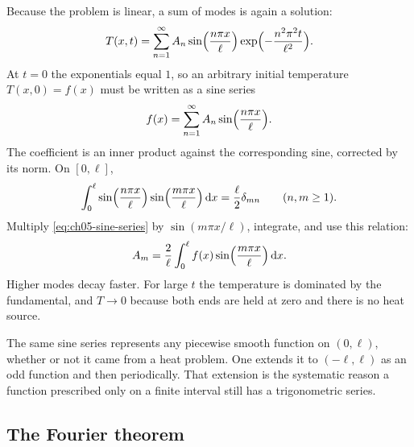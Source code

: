 Because the problem is linear, a sum of modes is again a solution:
\begin{equation}
T(x,t)=\sum_{n=1}^{\infty}A_n\sin\Bigl(\frac{n\pi x}{\ell}\Bigr)
\exp\Bigl(-\frac{n^2\pi^2 t}{\ell^2}\Bigr).
\end{equation}
At $t=0$ the exponentials equal $1$, so an arbitrary initial temperature $T(x,0)=f(x)$ must be written as a sine series
\begin{equation}
f(x)=\sum_{n=1}^{\infty}A_n\sin\Bigl(\frac{n\pi x}{\ell}\Bigr).
\label{eq:ch05-sine-series}
\end{equation}
The coefficient is an inner product against the corresponding sine, corrected by its norm. On $[0,\ell]$,
\begin{equation}
\int_0^\ell\sin\Bigl(\frac{n\pi x}{\ell}\Bigr)\sin\Bigl(\frac{m\pi x}{\ell}\Bigr)\,\mathrm{d}x
=\frac{\ell}{2}\delta_{mn}
\qquad(n,m\geq 1).
\end{equation}
Multiply \eqref{eq:ch05-sine-series} by $\sin(m\pi x/\ell)$, integrate, and use this relation:
\begin{equation}
A_m=\frac{2}{\ell}\int_0^\ell f(x)\sin\Bigl(\frac{m\pi x}{\ell}\Bigr)\,\mathrm{d}x.
\label{eq:ch05-sine-coeff}
\end{equation}
Higher modes decay faster. For large $t$ the temperature is dominated by the fundamental, and $T\to 0$ because both ends are held at zero and there is no heat source.

The same sine series represents any piecewise smooth function on $(0,\ell)$, whether or not it came from a heat problem. One extends it to $(-\ell,\ell)$ as an odd function and then periodically. That extension is the systematic reason a function prescribed only on a finite interval still has a trigonometric series.

\subsection{The Fourier theorem}

